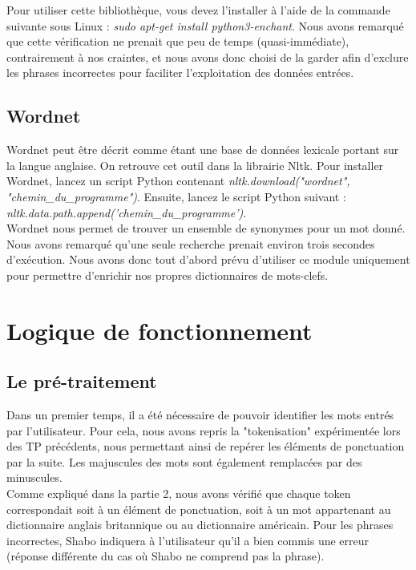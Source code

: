 \documentclass[paper=a4]{article}
\begin{document}
Pour utiliser cette bibliothèque, vous devez l'installer à l'aide de la
commande suivante sous Linux : \textit{sudo apt-get install
python3-enchant}. Nous avons remarqué que cette vérification ne prenait
que peu de temps (quasi-immédiate), contrairement à nos craintes, et
nous avons donc choisi de la garder afin d'exclure les phrases
incorrectes pour faciliter l'exploitation des données entrées.

\subsection{Wordnet}

Wordnet peut être décrit comme étant une base de données lexicale portant
sur la langue anglaise. On retrouve cet outil dans la librairie Nltk.
Pour installer Wordnet, lancez un script Python contenant
\textit{nltk.download("wordnet", "chemin\_du\_programme")}. Ensuite,
lancez le script Python suivant :
\textit{nltk.data.path.append('chemin\_du\_programme')}. \\

Wordnet nous permet de trouver un ensemble de synonymes pour un mot
donné. Nous avons remarqué qu'une seule recherche prenait environ trois
secondes d'exécution. Nous avons donc tout d'abord prévu d'utiliser
ce module uniquement pour permettre d'enrichir nos propres
dictionnaires de mots-clefs. \\



\section{Logique de fonctionnement}

\subsection{Le pré-traitement}

Dans un premier temps, il a été nécessaire de pouvoir identifier les
mots entrés par l'utilisateur. Pour cela, nous avons repris la
"tokenisation" expérimentée lors des TP précédents, nous permettant
ainsi de repérer les éléments de ponctuation par la suite. Les
majuscules des mots sont également remplacées par des minuscules. \\

Comme expliqué dans la partie 2, nous avons vérifié que chaque token
correspondait soit à un élément de ponctuation, soit à un mot
appartenant au dictionnaire anglais britannique ou au dictionnaire
américain. Pour les phrases incorrectes, Shabo indiquera à l'utilisateur
qu'il a bien commis une erreur (réponse différente du cas où Shabo ne
comprend pas la phrase).
\end{document}
